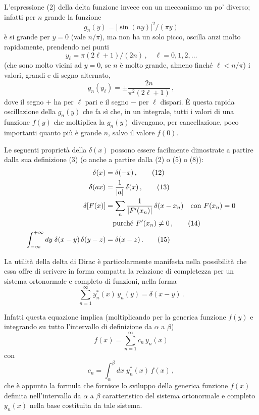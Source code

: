 \documentclass[11pt, a4paper]{book}
\numberwithin{equation}{section}
\begin{document}
L'espressione (2) della delta funzione invece con un meccanismo un po' diverso; infatti per $n$ grande la funzione
\begin{equation}
  g_n(y) = \bigl[\sin(ny)\bigr]^2/(\pi y) \tag{9}
\end{equation}
è si grande per $y=0$ (vale $n/\pi$), ma non ha un solo picco, oscilla anzi molto rapidamente, prendendo nei punti
\begin{equation}
  y_\ell = \pi(2\ell+1)/(2n)\,,\quad \ell=0,1,2,\ldots \tag{10}
\end{equation}
(che sono molto vicini ad $y=0$, se $n$ è molto grande, almeno finché $\ell < n/\pi$) i valori, grandi e di segno alternato,
\begin{equation}
  g_n(y_\ell) = \pm\frac{2n}{\pi^2(2\ell+1)}\,, \tag{11}
\end{equation}
dove il segno $+$ ha per $\ell$ pari e il segno $-$ per $\ell$ dispari. È questa rapida oscillazione della $g_n(y)$ che fa sì che, in un integrale, tutti i valori di una funzione $f(y)$ che moltiplica la $g_n(y)$ divengano, per cancellazione, poco importanti quanto più è grande $n$, salvo il valore $f(0)$.

Le seguenti proprietà della $\delta(x)$ possono essere facilmente dimostrate a partire dalla sua definizione (3) (o anche a partire dalla (2) o (5) o (8)):
\begin{align}
  \delta(x) &= \delta(-x)\,, \tag{12}\\
  \delta(ax) &= \frac{1}{|a|}\,\delta(x)\,, \tag{13}\\
  \delta[F(x)] &= \sum_n \frac{1}{|F'(x_n)|}\,\delta(x-x_n)
    \quad\text{con } F(x_n)=0 \notag\\
  &\quad\text{purché } F'(x_n)\neq 0\,, \tag{14}\\
  \int_{-\infty}^{+\infty} dy\;\delta(x-y)\,\delta(y-z) &= \delta(x-z)\,. \tag{15}
\end{align}

La utilità della delta di Dirac è particolarmente manifesta nella possibilità che essa offre di scrivere in forma compatta la relazione di completezza per un sistema ortonormale e completo di funzioni, nella forma
\begin{equation}
  \sum_{n=1}^{\infty} y_n^*(x)\,y_n(y) = \delta(x-y)\,. \tag{16}
\end{equation}

Infatti questa equazione implica (moltiplicando per la generica funzione $f(y)$ e integrando su tutto l'intervallo di definizione da $\alpha$ a $\beta$)
\begin{equation}
  f(x) = \sum_{n=1}^{\infty} c_n\,y_n(x) \tag{17}
\end{equation}
con
\begin{equation}
  c_n = \int_\alpha^\beta dx\;y_n^*(x)\,f(x)\,, \tag{18}
\end{equation}
che è appunto la formula che fornisce lo sviluppo della generica funzione $f(x)$ definita nell'intervallo da $\alpha$ a $\beta$ caratteristico del sistema ortonormale e completo $y_n(x)$ nella base costituita da tale sistema.
\end{document}
